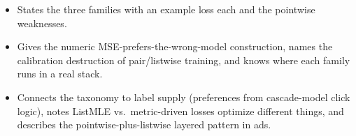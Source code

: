 \begin{interviewq}

\goodgreat
\begin{itemize}
    \item {} States the three families with an example loss each and the pointwise weaknesses.
    \item {} Gives the numeric MSE-prefers-the-wrong-model construction, names the calibration destruction of pair/listwise training, and knows where each family runs in a real stack.
    \item {} Connects the taxonomy to label supply (preferences from cascade-model click logic), notes ListMLE vs.\ metric-driven losses optimize different things, and describes the pointwise-plus-listwise layered pattern in ads.
\end{itemize}

\end{interviewq}

